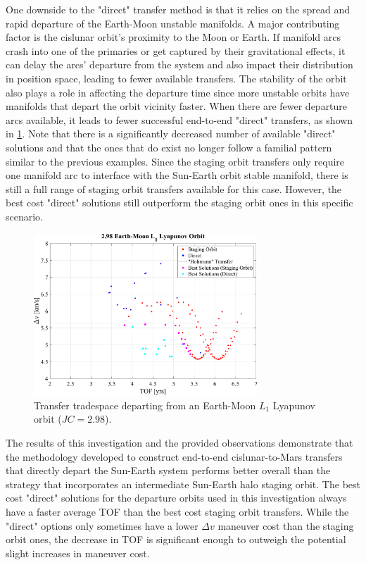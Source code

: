 One downside to the "direct" transfer method is that it relies on the spread and rapid departure of
the Earth-Moon unstable manifolds. A major contributing factor is the cislunar orbit's proximity to
the Moon or Earth. If manifold arcs crash into one of the primaries or get captured by their
gravitational effects, it can delay the arcs' departure from the system and also impact their
distribution in position space, leading to fewer available transfers. The stability of the orbit
also plays a role in affecting the departure time since more unstable orbits have manifolds that
depart the orbit vicinity faster. When there are fewer departure arcs available, it leads to fewer
successful end-to-end "direct" transfers, as shown in \cref{fig:fewDirect}. Note that there is a
significantly decreased number of available "direct" solutions and that the ones that do exist no
longer follow a familial pattern similar to the previous examples. Since the staging orbit
transfers only require one manifold arc to interface with the Sun-Earth orbit stable manifold,
there is still a full range of staging orbit transfers available for this case. However, the best
cost "direct" solutions still outperform the staging orbit ones in this specific scenario.

\begin{figure}[ht]
    \centering
    \includegraphics[width=0.75\textwidth]{figures/TradeSpace_L1Lyapunov_2_98.pdf}
    \caption{Transfer tradespace departing from an Earth-Moon $L_{1}$ Lyapunov orbit ($JC=2.98$).}
    \label{fig:fewDirect}
\end{figure}

The results of this investigation and the provided observations demonstrate that the methodology
developed to construct end-to-end cislunar-to-Mars transfers that directly depart the Sun-Earth
system performs better overall than the strategy that incorporates an intermediate Sun-Earth halo
staging orbit. The best cost "direct" solutions for the departure orbits used in this investigation
always have a faster average TOF than the best cost staging orbit transfers. While the "direct"
options only sometimes have a lower $\Delta v$ maneuver cost than the staging orbit ones, the
decrease in TOF is significant enough to outweigh the potential slight increases in maneuver cost.
